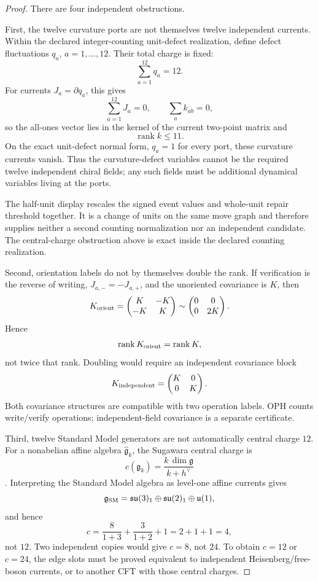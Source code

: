 \documentclass[11pt]{article}
\theoremstyle{remark}
\theoremstyle{plain}
\begin{document}
\begin{proof}
There are four independent obstructions.

First, the twelve curvature ports are not themselves twelve independent
currents. Within the declared integer-counting unit-defect realization, define
defect fluctuations \(q_a\), \(a=1,\ldots,12\). Their total charge is fixed:
\[
\sum_{a=1}^{12}q_a=12.
\]
For currents \(J_a=\partial q_a\), this gives
\[
\sum_{a=1}^{12}J_a=0,
\qquad
\sum_a k_{ab}=0,
\]
so the all-ones vector lies in the kernel of the current two-point matrix and
\[
\operatorname{rank}k\le 11.
\]
On the exact unit-defect normal form, \(q_a=1\) for every port, these curvature currents vanish.
Thus the curvature-defect variables cannot be the required twelve independent chiral fields; any
such fields must be additional dynamical variables living at the ports.

The half-unit display rescales the signed event values and whole-unit repair
threshold together. It is a change of units on the same move graph and
therefore supplies neither a second counting normalization nor an independent
candidate. The central-charge obstruction above is exact inside the declared
counting realization.

Second, orientation labels do not by themselves double the rank. If verification is the reverse of
writing, \(J_{a,-}=-J_{a,+}\), and the unoriented covariance is \(K\), then
\[
K_{\rm orient}=
\begin{pmatrix}
K&-K\\
-K&K
\end{pmatrix}
\sim
\begin{pmatrix}
0&0\\
0&2K
\end{pmatrix}.
\]
Hence
\[
\operatorname{rank}K_{\rm orient}=\operatorname{rank}K,
\]
not twice that rank. Doubling would require an independent covariance block
\[
K_{\rm independent}=
\begin{pmatrix}
K&0\\
0&K
\end{pmatrix}.
\]
Both covariance structures are compatible with two operation labels. OPH counts write/verify
operations; independent-field covariance is a separate certificate.

Third, twelve Standard Model generators are not automatically central charge \(12\). For a
nonabelian affine algebra \(\widehat{\mathfrak g}_k\), the Sugawara central charge is
\[
c(\mathfrak g_k)=\frac{k\,\dim\mathfrak g}{k+h^\vee}
\]
\cite{DiFrancescoCFT}. Interpreting the Standard Model algebra as level-one affine currents gives
\[
\mathfrak g_{\rm SM}
=
\mathfrak{su}(3)_1\oplus\mathfrak{su}(2)_1\oplus\mathfrak u(1),
\]
and hence
\[
c=\frac{8}{1+3}+\frac{3}{1+2}+1=2+1+1=4,
\]
not \(12\). Two independent copies would give \(c=8\), not \(24\). To obtain \(c=12\) or \(c=24\),
the edge slots must be proved equivalent to independent Heisenberg/free-boson currents, or to
another CFT with those central charges.


\end{proof}
\end{document}

